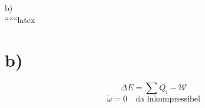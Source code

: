 b) \\

``````latex



\section*{b)}
\[
\Delta E = \sum Q_i - \mathcal{W}
\]
\[
\dot{\omega} = 0 \quad \text{da inkompressibel}
\]